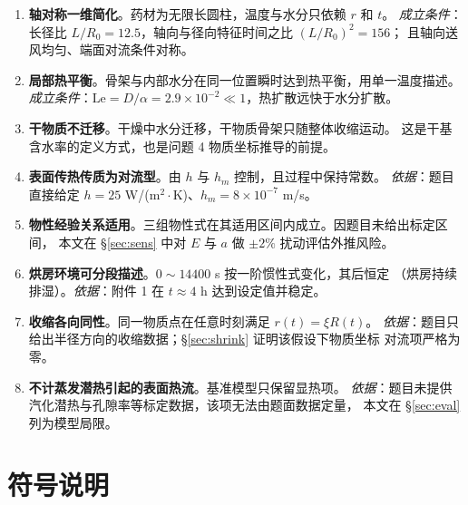 \documentclass[bwprint]{cumcmthesis}
\begin{document}
\begin{enumerate}[leftmargin=1.9em,itemsep=2pt]
\item \textbf{轴对称一维简化}。药材为无限长圆柱，温度与水分只依赖 $r$ 和 $t$。
\emph{成立条件}：长径比 $L/R_0=12.5$，轴向与径向特征时间之比 $(L/R_0)^2=156$；
且轴向送风均匀、端面对流条件对称。
\item \textbf{局部热平衡}。骨架与内部水分在同一位置瞬时达到热平衡，用单一温度描述。
\emph{成立条件}：$\mathrm{Le}=D/\alpha=2.9\times10^{-2}\ll1$，热扩散远快于水分扩散。
\item \textbf{干物质不迁移}。干燥中水分迁移，干物质骨架只随整体收缩运动。
这是干基含水率的定义方式，也是问题 4 物质坐标推导的前提。
\item \textbf{表面传热传质为对流型}。由 $h$ 与 $h_m$ 控制，且过程中保持常数。
\emph{依据}：题目直接给定 $h=25$ W/(m$^2\cdot$K)、$h_m=8\times10^{-7}$ m/s。
\item \textbf{物性经验关系适用}。三组物性式在其适用区间内成立。因题目未给出标定区间，
本文在 \S\ref{sec:sens} 中对 $E$ 与 $a$ 做 $\pm2\%$ 扰动评估外推风险。
\item \textbf{烘房环境可分段描述}。$0\sim14400$ s 按一阶惯性式变化，其后恒定
（烘房持续排湿）。\emph{依据}：附件 1 在 $t\approx4$ h 达到设定值并稳定。
\item \textbf{收缩各向同性}。同一物质点在任意时刻满足 $r(t)=\xi R(t)$。
\emph{依据}：题目只给出半径方向的收缩数据；\S\ref{sec:shrink} 证明该假设下物质坐标
对流项严格为零。
\item \textbf{不计蒸发潜热引起的表面热流}。基准模型只保留显热项。
\emph{依据}：题目未提供汽化潜热与孔隙率等标定数据，该项无法由题面数据定量，
本文在 \S\ref{sec:eval} 列为模型局限。
\end{enumerate}

\section{符号说明}
\end{document}
